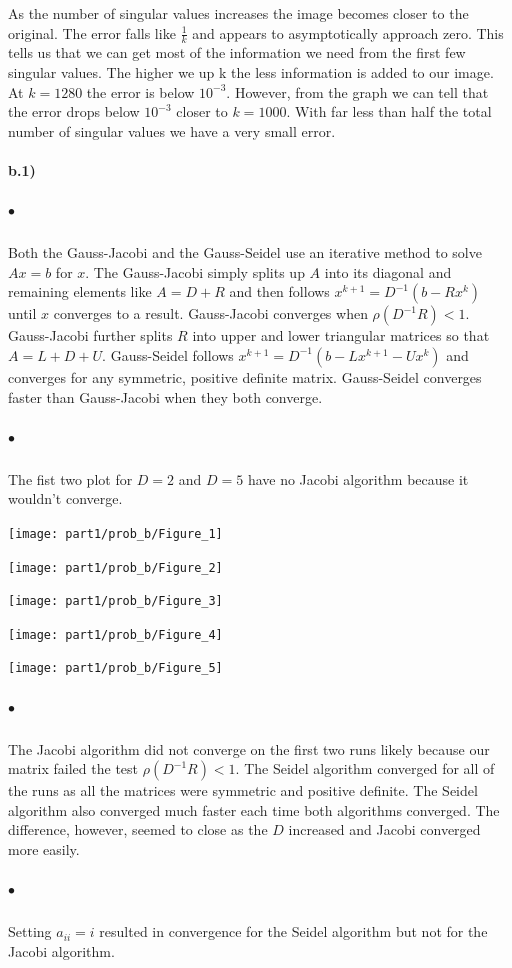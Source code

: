 \documentclass[12pt]{article}
\begin{document}
		As the number of singular values increases the image becomes closer to the original. The error falls like $\frac{1}{k}$ and appears to asymptotically approach zero. This tells us that we can get most of the information we need from the first few singular values. The higher we up k the less information is added to our image. At $k = 1280$ the error is below $10^{-3}$. However, from the graph we can tell that the error drops below $10^{-3}$ closer to $k = 1000$. With far less than half the total number of singular values we have a very small error.
	
\paragraph{b.1)}
	\subparagraph{$\bullet$}
		Both the Gauss-Jacobi and the Gauss-Seidel use an iterative method to solve $Ax = b$ for $x$. The Gauss-Jacobi simply splits up $A$ into its diagonal and remaining elements like $A = D + R$ and then follows $x^{k+1} = D^{-1}(b - Rx^k)$ until $x$ converges to a result. Gauss-Jacobi converges when $\rho(D^{-1}R) < 1$. Gauss-Jacobi further splits $R$ into upper and lower triangular matrices so that $A = L + D + U$. Gauss-Seidel follows $x^{k+1} = D^{-1}(b - Lx^{k+1} - Ux^{k})$ and converges for any symmetric, positive definite matrix. Gauss-Seidel converges faster than Gauss-Jacobi when they both converge. 
		
	\subparagraph{$\bullet$}
		The fist two plot for $D = 2$ and $D = 5$ have no Jacobi algorithm because it wouldn't converge.
		
		\texttt{[image: part1/prob\_b/Figure\_1]}
		
		\texttt{[image: part1/prob\_b/Figure\_2]}
		
		\texttt{[image: part1/prob\_b/Figure\_3]}
		
		\texttt{[image: part1/prob\_b/Figure\_4]}
		
		\texttt{[image: part1/prob\_b/Figure\_5]}
	
	\subparagraph{$\bullet$}
		The Jacobi algorithm did not converge on the first two runs likely because our matrix failed the test $\rho(D^{-1}R) < 1$. The Seidel algorithm converged for all of the runs as all the matrices were symmetric and positive definite. The Seidel algorithm also converged much faster each time both algorithms converged. The difference, however, seemed to close as the $D$ increased and Jacobi converged more easily.
		
	\subparagraph{$\bullet$}
		Setting $a_{ii} = i$ resulted in convergence for the Seidel algorithm but not for the Jacobi algorithm.
		
\end{document}
